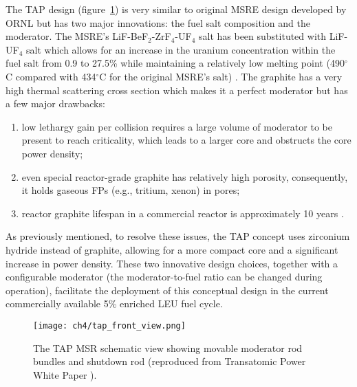 The \gls{TAP} design (figure~\ref{fig:tap-side-view}) is very similar to 
original \gls{MSRE} design developed by \gls{ORNL} 
\cite{haubenreich_experience_1970} but has two major innovations: 
the fuel salt composition and the moderator. The \gls{MSRE}'s 
LiF-BeF$_2$-ZrF$_4$-UF$_4$ salt has been substituted with LiF-UF$_4$ salt 
which allows for an increase in the uranium concentration within the fuel salt 
from 0.9 to 27.5\% while maintaining a relatively low melting point 
(490$^{\circ}$C compared with 434$^{\circ}$C for the original \gls{MSRE}'s 
salt) \cite{betzler_two-dimensional_2017}. The graphite has a very high 
thermal scattering cross section which makes it a perfect moderator but has 
a few major drawbacks: 
\begin{enumerate}[label=(\alph*), itemsep=-1ex]
	\item low lethargy gain per collision requires a large volume of 
	moderator to be present to reach criticality, which leads to a larger core 
	and obstructs the core power density;
	\item even special reactor-grade graphite has relatively high porosity, 
	consequently, it holds gaseous \glspl{FP} (e.g., tritium, xenon) in pores;
	\item reactor graphite lifespan in a commercial reactor is 
	approximately 10 years \cite{robertson_conceptual_1971}.
\end{enumerate}
As previously mentioned, to resolve these issues, the \gls{TAP} concept uses 
zirconium hydride instead of graphite, allowing for a more compact core and a 
significant increase in power density. These two innovative design choices, 
together with a configurable moderator (the moderator-to-fuel ratio can be 
changed during operation), facilitate the deployment of this conceptual design 
in the current commercially available 5\% enriched \gls{LEU} fuel cycle. 
\begin{figure}[h] %
	\hspace{+2.2in}
	\texttt{[image: ch4/tap\_front\_view.png]}
	\caption{The \gls{TAP} \gls{MSR} schematic view showing movable moderator 
		rod bundles and shutdown rod (reproduced from Transatomic Power 
		White Paper \cite{transatomic_power_corporation_technical_2016}).}
	\label{fig:tap-side-view}
\end{figure}

